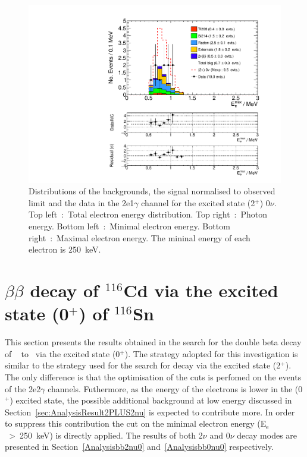 \documentclass[main.tex]{subfiles}
\begin{document}
\begin{figure} [h!]
\begin{center}
\includegraphics[scale=0.36]{pictures/FinalResults/bb0nu2/150precut/Eemax_bb0nu2.pdf}
\end{center}
\caption{Distributions of the backgrounds, the signal normalised to observed limit and the data in the 2e1$\gamma$ channel for the excited state (2$^+$) 0$\nu$. Top left~:~Total electron energy distribution. Top right~:~Photon energy. Bottom left~:~Minimal electron energy. Bottom right~:~Maximal electron energy. The mininal energy of each electron is 250~keV.}
\label{plot:SEeAndEg250bb0nu2Precut}
\end{figure}


\FloatBarrier


\section{$\beta\beta$ decay of $^{\text{116}}$Cd via the excited state (0$^+$) of $^{\text{116}}$Sn}\label{sec:Result0PLUS}


\NI This section presents the results obtained in the search for the double beta decay of \Cd ~ to \Sn ~via the excited state  (0$^+$). The strategy adopted for this investigation is similar to the strategy used for the search for decay via the excited state (2$^+$). The only difference is that the optimisation of the cuts is perfomed on the events of the 2e2$\gamma$ channels. Futhermore, as the energy of the electrons is lower in the (0$^+$) excited state, the possible additional background at low energy discussed in Section~\ref{sec:AnalysisResult2PLUS2nu} is expected to contribute more. In order to suppress this contribution the cut on the minimal electron energy (E$_\text{e}$~>~250~keV) is directly applied. The results of both 2$\nu$ and  0$\nu$ decay modes are presented in Section~\ref{Analysisbb2nu0} and~\ref{Analysisbb0nu0} respectively.
\end{document}
